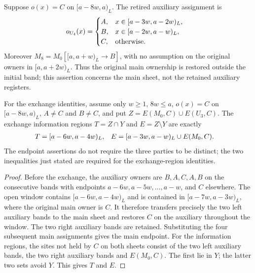 \begin{lemma}
    \label{thm:chain_one_band_geometry}
    \leanok
    Suppose $o(x)=C$ on $[a-8w,a)_L$.
    The retired auxiliary assignment is
    \begin{align}
        o_{U_4}(x) & =
        \begin{cases}
            A, & x\in[a-3w,a-2w)_L, \\
            B, & x\in[a-2w,a-w)_L,  \\
            C, & \text{otherwise}.
        \end{cases}\notag
    \end{align}
    Moreover $M_8=M_0[\lbrack a,a+w)_L\to B]$, with no assumption on the
    original owners in $\lbrack a,a+2w)_L$.
    Thus the original main ownership is restored outside the initial band;
    this assertion concerns the main sheet, not the retained auxiliary registers.

    For the exchange identities, assume only $w\ge1$, $8w\le a$,
    $o(x)=C$ on $[a-8w,a)_L$, $A\ne C$ and $B\ne C$, and put
    $Z=E(M_0,C)\cup E(U_3,C)$.
    The exchange information regions $T=Z\cap Y$ and $E=Z\setminus Y$ are exactly
    \begin{align}
        T & =[a-6w,a-4w)_L,                   &
        E & =[a-3w,a-w)_L\cup E(M_0,C).\notag
    \end{align}
    The endpoint assertions do not require the three parties to be distinct;
    the two inequalities just stated are required for the exchange-region identities.
\end{lemma}
\begin{proof}\leanok
    Before the exchange, the auxiliary owners are $B,A,C,A,B$ on the
    consecutive bands with endpoints $a-6w,a-5w,\ldots,a-w$, and $C$ elsewhere.
    The open window contains $[a-6w,a-4w)_L$ and is contained in
    $[a-7w,a-3w)_L$, where the original main owner is $C$.
    It therefore transfers precisely the two left auxiliary bands to the main
    sheet and restores $C$ on the auxiliary throughout the window. The two
    right auxiliary bands are retained. Substituting the four subsequent
    main assignments gives the main endpoint. For the information regions,
    the sites not held by $C$ on both sheets consist of the two left
    auxiliary bands, the two right auxiliary bands and $E(M_0,C)$.
    The first lie in $Y$; the latter two sets avoid $Y$. This gives $T$ and $E$.
\end{proof}

